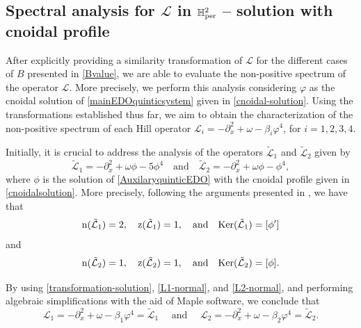 \documentclass[10pt,reqno,a4paper]{amsart} %
\theoremstyle{definition} %
\numberwithin{equation}{section}
\numberwithin{figure}{section}
\begin{document}
\subsection{Spectral analysis for $\mathcal{L}$ in $\mathbb{H}^2_{\rm per}$ -- solution with cnoidal profile}\label{spectral-analysis-cnoidal}

After explicitly providing a similarity transformation of $\mathcal{L}$ for the different cases of $B$ presented in \eqref{Bvalue}, we are able to evaluate the non-positive spectrum of the operator $\mathcal{L}$. More precisely, we perform this analysis considering $\varphi$ as the cnoidal solution of \eqref{mainEDOquinticsystem} given in \eqref{cnoidal-solution}. Using the transformations established thus far, we aim to obtain the characterization of the non-positive spectrum of each Hill operator $\mathcal{L}_i = -\partial_x^2 + \omega - \beta_i \varphi^4$, for $i=1,2,3,4$.

Initially, it is crucial to address the analysis of the operators $\tilde{\mathcal{L}}_1$ and $\tilde{\mathcal{L}}_2$ given by
\begin{equation*}
    \tilde{\mathcal{L}}_1 = -\partial_x^2 + \omega \phi - 5\phi^4 \quad \text{and} \quad \tilde{\mathcal{L}}_2 = -\partial_x^2 + \omega \phi - \phi^4,
\end{equation*}
where $\phi$ is the solution of \eqref{AuxilaryquinticEDO} with the cnoidal profile given in \eqref{cnoidalsolution}. More precisely, following the arguments presented in \cite{BittencourtLoreno2022}, we have that 
\begin{equation}\label{L1-normal}
    {\rm n}(\tilde{\mathcal{L}}_1) = 2, \quad {\rm z}(\tilde{\mathcal{L}}_1) = 1, \quad \text{and} \quad {\rm Ker}(\tilde{\mathcal{L}}_1) = [\phi']
\end{equation}
and
\begin{equation}\label{L2-normal}
    {\rm n}(\tilde{\mathcal{L}}_2) = 1, \quad {\rm z}(\tilde{\mathcal{L}}_2) = 1, \quad \text{and} \quad {\rm Ker}(\tilde{\mathcal{L}}_2) = [\phi].
\end{equation}

By using \eqref{transformation-solution}, \eqref{L1-normal}, and \eqref{L2-normal}, and performing algebraic simplifications with the aid of Maple software, we conclude that
\begin{equation*}
    \mathcal{L}_1 = -\partial_x^2 + \omega - \beta_1 \varphi^4 = \tilde{\mathcal{L}}_1 \quad \text{ and } \quad \mathcal{L}_2 = -\partial_x^2 + \omega - \beta_2 \varphi^4 = \tilde{\mathcal{L}}_2.
\end{equation*}
\end{document}
